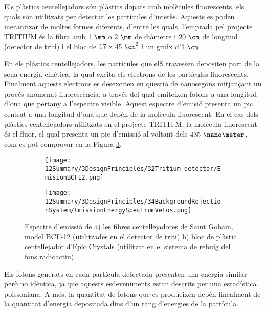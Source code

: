 Els plàstics centellejadors són plàstics dopats amb molècules fluorescents, els quals són utilitzats per detectar les partícules d'interès. Aquests es poden mecanitzar de moltes formes diferents, d'entre les quals, l'emprada pel projecte TRITIUM és la fibra amb $1~\mm$ o $2~\mm$ de diàmetre i $20~\cm$ de longitud (detector de triti) i el bloc de $17\times 45~\cm^2$ i un gruix d'$1~\cm$. 

En els plàstics centellejadors, les partícules que elS travessen depositen part de la seua energia cinètica, la qual excita els electrons de les partícules fluorescents. Finalment aquests electrons es desexciten en qüestió de nanosegons mitjançant un procés anomenat fluorescència, a través del qual emiteixen fotons a una longitud d'ona que pertany a l'espectre visible. Aquest espectre d'emisió presenta un pic centrat a una longitud d'ona que depèn de la molècula fluorescent. En el cas dels plàstics centellejadors utilitzats en el projecte TRITIUM, la molècula fluorescent és el fluor, el qual presenta un pic d'emissió al voltant dels $435~\nano\meter$, com es pot comprovar en la Figura \ref{fig:EspectreEmisioPlasticsTRITIUM}.
\begin{figure}
\centering
    \begin{subfigure}[b]{0.7\textwidth}
    \centering
    \texttt{[image: 12Summary/3DesignPrinciples/32Tritium\_detector/EmisionBCF12.png]}  
        \caption{}\label{subfig:EspectreEmisioFibres}
    \end{subfigure}
    \hfill
    \begin{subfigure}[b]{0.7\textwidth}
    \centering
    \texttt{[image: 12Summary/3DesignPrinciples/34BackgroundRejectionSystem/EmissionEnergySpectrumVetos.png]}  
    \caption{\label{subfig:EspectreEmisioVeto}}
    \end{subfigure}
\caption{Espectre d'emissió de a) les fibres centellejadores de Saint Gobain, model BCF-12 (utilitzades en el detector de triti) \cite{DataSheetBCF12Fiber} b) bloc de plàstic centellejador d'Epic Crystals (utilitzat en el sistema de rebuig del fons radioactiu)\cite{ScintillatorVeto}\label{fig:EspectreEmisioPlasticsTRITIUM}.}
\end{figure}
Els fotons generats en cada partícula detectada presenten una energia similar però no idèntica, ja que aquests esdeveniments estan descrits per una estadística poissoniana. A més, la quantitat de fotons que es produeixen depèn linealment de la quantitat d'energía depositada dins d'un rang d'energies de la partícula.

